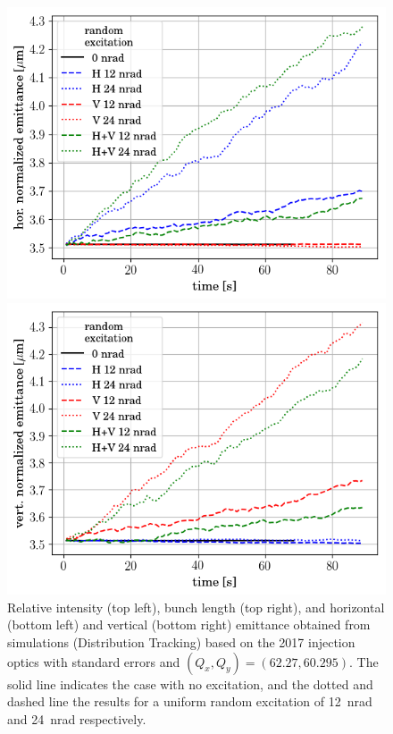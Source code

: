 \documentclass[%
 reprint,
 amsmath,amssymb,
 aps,
prstab,
]{revtex4-1}
\begin{document}
\begin{figure}[t]
\begin{minipage}[t]{0.49\linewidth}
	\end{minipage}
	\begin{minipage}[t]{0.49\linewidth}
		\centering
		\includegraphics[width=1.0\linewidth]{2017injerra2b2u_ranadt_3_5um_emit1.png}
	\end{minipage}	
	\begin{minipage}[t]{0.49\linewidth}
		\centering
		\includegraphics[width=1.0\linewidth]{2017injerra2b2u_ranadt_3_5um_emit2.png}
	\end{minipage}
	\caption{\label{fig:ransim} Relative intensity (top left), bunch length (top right), and horizontal (bottom left) and vertical (bottom right) emittance obtained from simulations (Distribution Tracking) based on the 2017 injection optics with standard errors and $(Q_x,Q_y)=(62.27,60.295)$. The solid line indicates the case with no excitation, and the dotted and dashed line the results for a uniform random excitation of 12~nrad and 24~nrad respectively.}
\end{figure}
\end{document}
